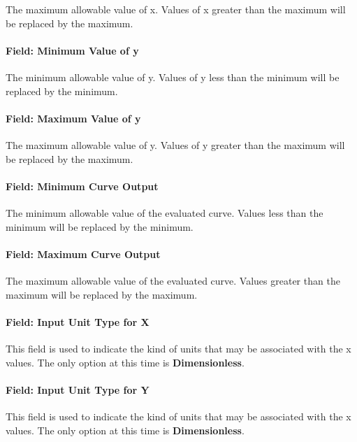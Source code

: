 The maximum allowable value of x. Values of x greater than the maximum will be replaced by the maximum.

\paragraph{Field: Minimum Value of y}\label{field-minimum-value-of-y-3}

The minimum allowable value of y. Values of y less than the minimum will be replaced by the minimum.

\paragraph{Field: Maximum Value of y}\label{field-maximum-value-of-y-3}

The maximum allowable value of y. Values of y greater than the maximum will be replaced by the maximum.

\paragraph{Field: Minimum Curve Output}\label{field-minimum-curve-output-7}

The minimum allowable value of the evaluated curve. Values less than the minimum will be replaced by the minimum.

\paragraph{Field: Maximum Curve Output}\label{field-maximum-curve-output-6}

The maximum allowable value of the evaluated curve. Values greater than the maximum will be replaced by the maximum.

\paragraph{Field: Input Unit Type for X}\label{field-input-unit-type-for-x-8}

This field is used to indicate the kind of units that may be associated with the x values. The only option at this time is \textbf{Dimensionless}.

\paragraph{Field: Input Unit Type for Y}\label{field-input-unit-type-for-y-3}

This field is used to indicate the kind of units that may be associated with the x values. The only option at this time is \textbf{Dimensionless}.

